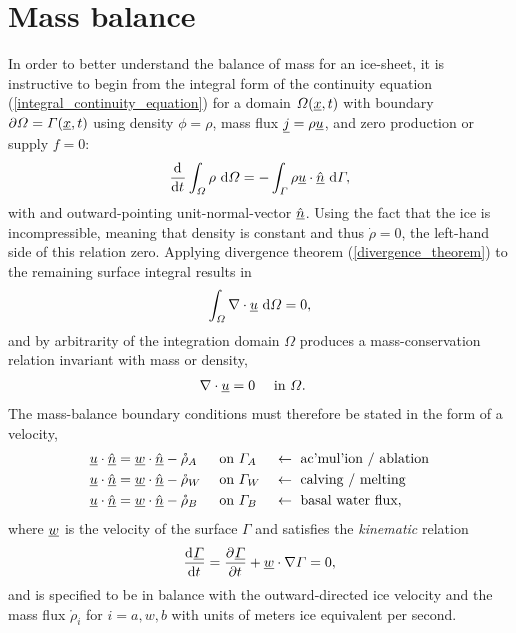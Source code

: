 
\chapter{Mass balance} \label{ssn_mass_balance}


In order to better understand the balance of mass for an ice-sheet, it is instructive to begin from the integral form of the continuity equation (\ref{integral_continuity_equation}) for a domain $\varOmega(\underline{x},t)$ with boundary $\partial \varOmega = \varGamma(\underline{x},t)$ using density $\phi = \rho$, mass flux $\underline{j} = \rho \underline{u}$, and zero production or supply $f = 0$:
\begin{align*}
  \frac{\mathrm{d}^{} }{\mathrm{d} t^{} } \int_{\varOmega} \rho \ \mathrm{d}\varOmega = - \int_{\varGamma} \rho \underline{u} \cdot \underline{\hat{n}} \ \mathrm{d}\varGamma,
\end{align*}
with and outward-pointing unit-normal-vector $\underline{\hat{n}}$.
Using the fact that the ice is incompressible, meaning that density is constant and thus $\dot{\rho} = 0$, the left-hand side of this relation zero.
Applying divergence theorem (\ref{divergence_theorem})  to the remaining surface integral results in
\begin{align*}
  \int_{\varOmega} \nabla \cdot \underline{u} \ \mathrm{d}\varOmega = 0,
\end{align*}
and by arbitrarity of the integration domain $\Omega$ produces a mass-conservation relation invariant with mass or density,
\begin{align}
  \nabla \cdot \underline{u} &= 0 &&\text{ in } \varOmega.
\end{align}
The mass-balance boundary conditions must therefore be stated in the form of a velocity,
\begin{align}
  \label{impenetrability}
  \underline{u} \cdot \underline{\hat{n}} &= \underline{w} \cdot \underline{\hat{n}} - \mathring{\rho}_A &&\text{ on } \varGamma_A &&\leftarrow \text{ ac'mul'ion / ablation} \\
  \underline{u} \cdot \underline{\hat{n}} &=  \underline{w} \cdot \underline{\hat{n}} - \mathring{\rho}_W &&\text{ on } \varGamma_W &&\leftarrow \text{ calving / melting} \\
  \underline{u} \cdot \underline{\hat{n}} &=  \underline{w} \cdot \underline{\hat{n}} - \mathring{\rho}_B &&\text{ on } \varGamma_B &&\leftarrow \text{ basal water flux},
\end{align}
where $\underline{w}$ is the velocity of the surface $\Gamma$ and satisfies the  \emph{kinematic} relation
\begin{align}
  \label{kinematic_boundary_balance}
  \frac{\mathrm{d}^{} \underline{\varGamma}}{\mathrm{d} t^{} } = \frac{\partial^{} \underline{\varGamma}}{\partial t^{} } + \underline{w} \cdot \nabla \varGamma = 0,
\end{align}
and is specified to be in balance with the outward-directed ice velocity and the mass flux $\mathring{\rho}_i$ for $i=a,w,b$ with units of meters ice equivalent per second.
